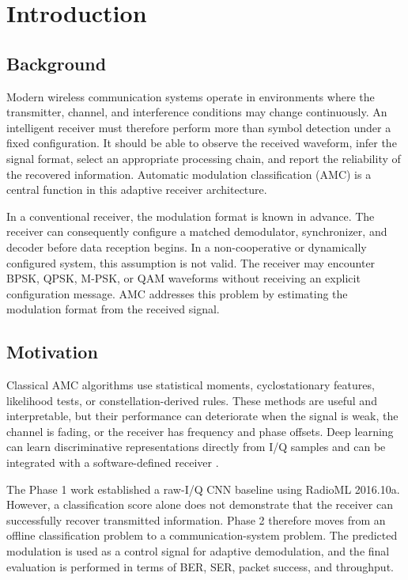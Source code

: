 \chapter{Introduction}

\section{Background}
Modern wireless communication systems operate in environments where the
transmitter, channel, and interference conditions may change continuously.
An intelligent receiver must therefore perform more than symbol detection
under a fixed configuration. It should be able to observe the received
waveform, infer the signal format, select an appropriate processing chain,
and report the reliability of the recovered information. Automatic modulation
classification (AMC) is a central function in this adaptive receiver
architecture.

In a conventional receiver, the modulation format is known in advance. The
receiver can consequently configure a matched demodulator, synchronizer, and
decoder before data reception begins. In a non-cooperative or dynamically
configured system, this assumption is not valid. The receiver may encounter
BPSK, QPSK, M-PSK, or QAM waveforms without receiving an explicit
configuration message. AMC addresses this problem by estimating the
modulation format from the received signal.

\section{Motivation}
Classical AMC algorithms use statistical moments, cyclostationary features,
likelihood tests, or constellation-derived rules. These methods are useful
and interpretable, but their performance can deteriorate when the signal is
weak, the channel is fading, or the receiver has frequency and phase offsets.
Deep learning can learn discriminative representations directly from I/Q
samples and can be integrated with a software-defined receiver
\cite{oshea2016convolutional}.

The Phase 1 work established a raw-I/Q CNN baseline using RadioML 2016.10a.
However, a classification score alone does not demonstrate that the receiver
can successfully recover transmitted information. Phase 2 therefore moves
from an offline classification problem to a communication-system problem.
The predicted modulation is used as a control signal for adaptive
demodulation, and the final evaluation is performed in terms of BER, SER,
packet success, and throughput.

